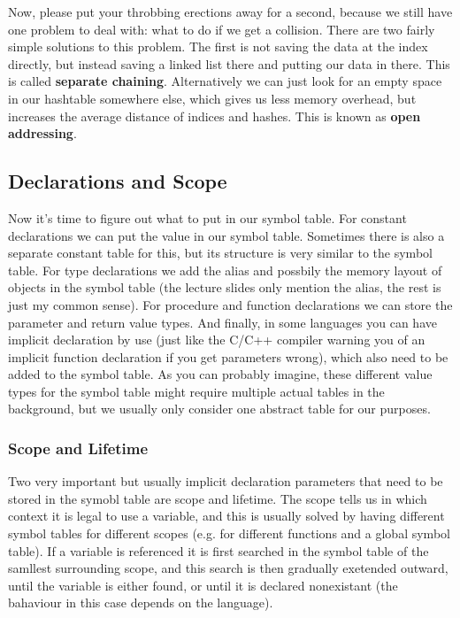 \documentclass{article}
\begin{document}
Now, please put your throbbing erections away for a second, because we still have one problem to deal with: what to do if we get a collision.
There are two fairly simple solutions to this problem.
The first is not saving the data at the index directly, but instead saving a linked list there and putting our data in there.
This is called \textbf{separate chaining}.
Alternatively we can just look for an empty space in our hashtable somewhere else, which gives us less memory overhead, but increases the average distance of indices and hashes.
This is known as \textbf{open addressing}.

\subsection{Declarations and Scope}
Now it's time to figure out what to put in our symbol table.
For constant declarations we can put the value in our symbol table.
Sometimes there is also a separate constant table for this, but its structure is very similar to the symbol table.
For type declarations we add the alias and possbily the memory layout of objects in the symbol table (the lecture slides only mention the alias, the rest is just my common sense).
For procedure and function declarations we can store the parameter and return value types.
And finally, in some languages you can have implicit declaration by use (just like the C/C++ compiler warning you of an implicit function declaration if you get parameters wrong), which also need to be added to the symbol table.
As you can probably imagine, these different value types for the symbol table might require multiple actual tables in the background, but we usually only consider one abstract table for our purposes.

\subsubsection{Scope and Lifetime}
Two very important but usually implicit declaration parameters that need to be stored in the symobl table are scope and lifetime.
The scope tells us in which context it is legal to use a variable, and this is usually solved by having different symbol tables for different scopes (e.g. for different functions and a global symbol table).
If a variable is referenced it is first searched in the symbol table of the samllest surrounding scope, and this search is then gradually exetended outward, until the variable is either found, or until it is declared nonexistant (the bahaviour in this case depends on the language).
\end{document}
